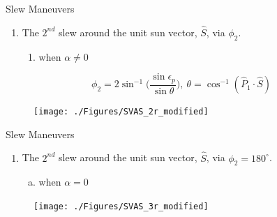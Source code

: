 \documentclass{beamer}
\begin{document}
\begin{frame}
\begin{block}{Slew Maneuvers}
\begin{enumerate}[2]
\item The $2^{nd}$ slew around the unit sun vector, $\hat{S}$, via $\phi_2$.
\begin{enumerate}[a]
\item when $\alpha\neq0$
\end{enumerate}
\end{enumerate}
\begin{equation}
\phi_2=2\sin^{-1}\Big( \frac{\sin\epsilon_p}{\sin \theta}\Big),\ \theta=\cos^{-1}(\hat{P}_1\cdot\hat{S})
\end{equation}
\begin{figure}
\texttt{[image: ./Figures/SVAS\_2r\_modified]}
\end{figure}
\end{block}
\end{frame}
\begin{frame}
\begin{block}{Slew Maneuvers}
\begin{enumerate}[2]
\item The $2^{nd}$ slew around the unit sun vector, $\hat{S}$, via $\phi_2=180^{\circ}$.
\begin{enumerate}[b)]
\item when $\alpha=0$
\end{enumerate}
\end{enumerate}
\begin{figure}
\texttt{[image: ./Figures/SVAS\_3r\_modified]}
\end{figure}
\end{block}
\end{frame}
\end{document}

